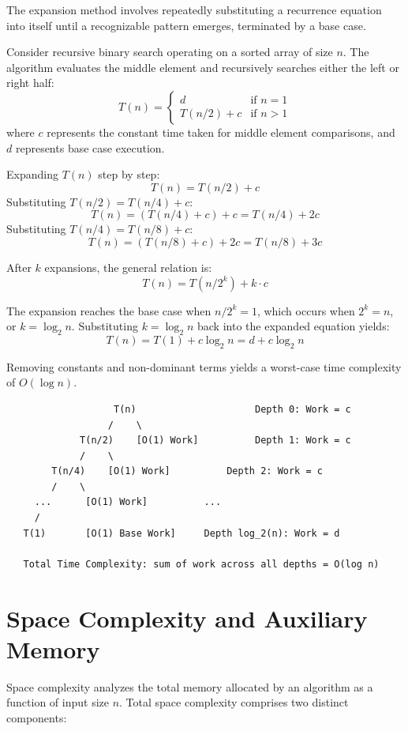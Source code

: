 \documentclass[12pt]{report}
\begin{document}
The expansion method involves repeatedly substituting a recurrence equation into itself until a recognizable pattern emerges, terminated by a base case.

Consider recursive binary search operating on a sorted array of size $n$. The algorithm evaluates the middle element and recursively searches either the left or right half:
\begin{equation}
T(n) = 
\begin{cases} 
d & \text{if } n = 1 \\ 
T(n/2) + c & \text{if } n > 1 
\end{cases}
\end{equation}
where $c$ represents the constant time taken for middle element comparisons, and $d$ represents base case execution.

Expanding $T(n)$ step by step:
\[
T(n) = T(n/2) + c
\]
Substituting $T(n/2) = T(n/4) + c$:
\[
T(n) = (T(n/4) + c) + c = T(n/4) + 2c
\]
Substituting $T(n/4) = T(n/8) + c$:
\[
T(n) = (T(n/8) + c) + 2c = T(n/8) + 3c
\]

After $k$ expansions, the general relation is:
\[
T(n) = T(n/2^k) + k \cdot c
\]

The expansion reaches the base case when $n/2^k = 1$, which occurs when $2^k = n$, or $k = \log_2 n$. Substituting $k = \log_2 n$ back into the expanded equation yields:
\[
T(n) = T(1) + c \log_2 n = d + c \log_2 n
\]

Removing constants and non-dominant terms yields a worst-case time complexity of $O(\log n)$.

\begin{verbatim}
                   T(n)                     Depth 0: Work = c
                  /    \
             T(n/2)    [O(1) Work]          Depth 1: Work = c
             /    \
        T(n/4)    [O(1) Work]          Depth 2: Work = c
        /    \
     ...      [O(1) Work]          ...
     /
   T(1)       [O(1) Base Work]     Depth log_2(n): Work = d

   Total Time Complexity: sum of work across all depths = O(log n)
\end{verbatim}

\section{Space Complexity and Auxiliary Memory}

Space complexity analyzes the total memory allocated by an algorithm as a function of input size $n$. Total space complexity comprises two distinct components:
\end{document}
